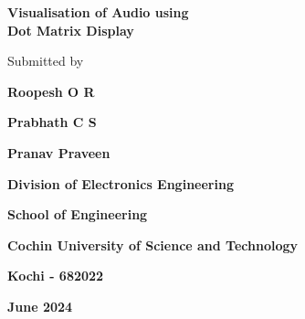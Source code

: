 \documentclass[12pt, a4paper]{article}
\begin{document}
\begin{titlepage}
	\centering

	{\huge \textbf{Visualisation of Audio using\\ Dot Matrix Display} \par}

	\vspace{1.3cm}

	{\large Submitted by \par}

	\vspace{.5cm}

	{\large \textbf{Roopesh O R}\par}
	{\large \textbf{Prabhath C S}\par}
	{\large \textbf{Pranav Praveen}\par}

	\vspace{3cm}

	\par

	\vspace{.1cm}

	{\textbf{Division of Electronics Engineering} \par}
	{\textbf{School of Engineering} \par}
	{\textbf{Cochin University of Science and Technology} \par}
	{\textbf{Kochi - 682022} \par}

	\vspace{.5cm}

	{\textbf{June 2024} \par}

	\vfill

\end{titlepage}


\newcommand{\usection}[1]{
	\section*{\center \Huge #1}
	\addcontentsline{toc}{section}{\protect\numberline{}#1}
}
\newcommand{\usubsection}[1]{
	\section*{\LARGE #1}
	\addcontentsline{toc}{subsection}{\protect\numberline{}#1}
}
\end{document}
